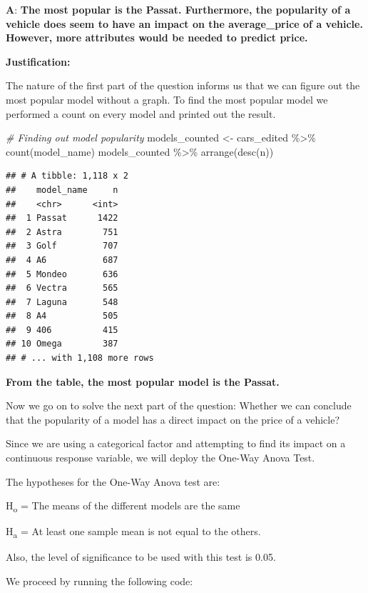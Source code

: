 \documentclass[
]{article}
\newenvironment{Shaded}{\begin{snugshade}}{\end{snugshade}}
\newcommand{\CommentTok}[1]{\textcolor[rgb]{0.56,0.35,0.01}{\textit{#1}}}
\newcommand{\FunctionTok}[1]{\textcolor[rgb]{0.00,0.00,0.00}{#1}}
\newcommand{\NormalTok}[1]{#1}
\newcommand{\OtherTok}[1]{\textcolor[rgb]{0.56,0.35,0.01}{#1}}
\newcommand{\SpecialCharTok}[1]{\textcolor[rgb]{0.00,0.00,0.00}{#1}}
\begin{document}
\textbf{A}: \textbf{The most popular is the Passat. Furthermore, the
popularity of a vehicle does seem to have an impact on the
average\_price of a vehicle. However, more attributes would be needed to
predict price.}

\textbf{Justification:}

The nature of the first part of the question informs us that we can
figure out the most popular model without a graph. To find the most
popular model we performed a count on every model and printed out the
result.

\begin{Shaded}
\begin{Highlighting}[]
\CommentTok{\# Finding out model popularity}
\NormalTok{models\_counted }\OtherTok{\textless{}{-}}\NormalTok{ cars\_edited }\SpecialCharTok{\%\textgreater{}\%} \FunctionTok{count}\NormalTok{(model\_name)}
\NormalTok{models\_counted }\SpecialCharTok{\%\textgreater{}\%} \FunctionTok{arrange}\NormalTok{(}\FunctionTok{desc}\NormalTok{(n))}
\end{Highlighting}
\end{Shaded}

\begin{verbatim}
## # A tibble: 1,118 x 2
##    model_name     n
##    <chr>      <int>
##  1 Passat      1422
##  2 Astra        751
##  3 Golf         707
##  4 A6           687
##  5 Mondeo       636
##  6 Vectra       565
##  7 Laguna       548
##  8 A4           505
##  9 406          415
## 10 Omega        387
## # ... with 1,108 more rows
\end{verbatim}

\textbf{From the table, the most popular model is the Passat.}

Now we go on to solve the next part of the question: Whether we can
conclude that the popularity of a model has a direct impact on the price
of a vehicle?

Since we are using a categorical factor and attempting to find its
impact on a continuous response variable, we will deploy the One-Way
Anova Test.

The hypotheses for the One-Way Anova test are:

H\textsubscript{o} = The means of the different models are the same

H\textsubscript{a} = At least one sample mean is not equal to the
others.

Also, the level of significance to be used with this test is 0.05.

We proceed by running the following code:
\end{document}
